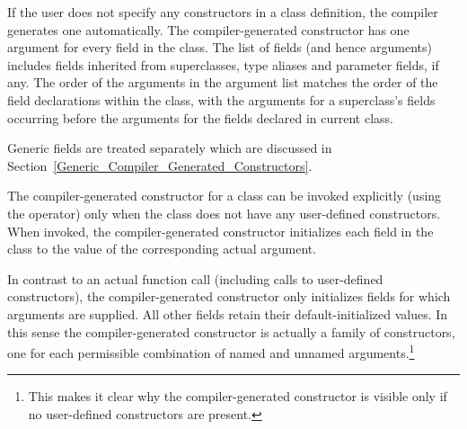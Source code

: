 If the user does not specify any constructors in a class definition, the
compiler generates one automatically.
The compiler-generated constructor has one argument for every field in the class.
The list of fields (and hence arguments) includes fields inherited from superclasses, type aliases
and parameter fields, if any.
The order of the arguments in the argument list matches the order of the field declarations
within the class, with the arguments for a superclass's fields occurring
before the arguments for the fields declared in current class.

Generic fields are treated separately
which are discussed in Section~\ref{Generic_Compiler_Generated_Constructors}.

The compiler-generated constructor for a class can be invoked explicitly (using
the  operator) only when the class does not have any user-defined constructors.
When invoked, the compiler-generated constructor initializes each field in the class to the
value of the corresponding actual argument.  

In contrast to an actual function
call (including calls to user-defined constructors), the compiler-generated
constructor only initializes fields for which arguments are supplied.  All other
fields retain their default-initialized values.  In this sense the
compiler-generated constructor is actually a family of constructors, one for
each permissible combination of named and unnamed arguments.\footnote{This makes
it clear why the compiler-generated constructor is visible only if no
user-defined constructors are present.}

